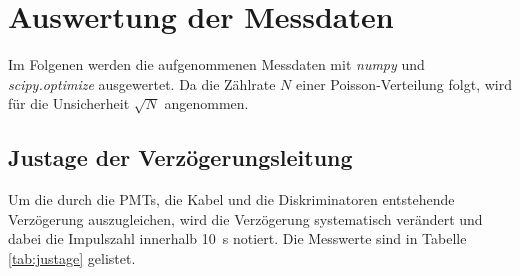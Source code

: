 \section{Auswertung der Messdaten}
\label{sec:Auswertung}
Im Folgenen werden die aufgenommenen Messdaten mit \textit{numpy} und \textit{scipy.optimize} ausgewertet. Da die Zählrate $N$ einer Poisson-Verteilung folgt, wird
für die Unsicherheit $\sqrt{N}$ angenommen. 

\subsection*{Justage der Verzögerungsleitung}
\label{sec:justage}
Um die durch die PMTs, die Kabel und die Diskriminatoren entstehende Verzögerung auszugleichen, wird die Verzögerung systematisch verändert und dabei die Impulszahl innerhalb \SI{10}{\second} 
notiert. Die Messwerte sind in Tabelle \ref*{tab:justage} gelistet. 

